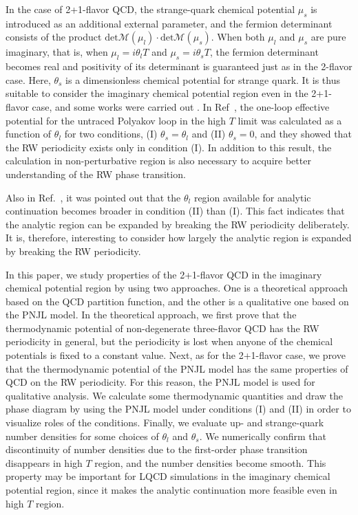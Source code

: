 \documentclass[prd,superscriptaddress,unsortedaddress,
twocolumn,showpacs,preprintnumbers,amsmath,amssymb]{revtex4}
\begin{document}
In the case of 2+1-flavor QCD,
the strange-quark chemical potential $\mu_{s}$
is introduced as an additional external parameter,
and the fermion determinant
consists of the product
$\textrm{det}\mathcal{M}(\mu_{l})\cdot\textrm{det}\mathcal{M}(\mu_{s})$.
When both $\mu_{l}$ and $\mu_{s}$ are pure imaginary,
that is, when $\mu_{l}=i\theta_{l}T$ and $\mu_{s}=i\theta_{s}T$,
the fermion determinant becomes real and
positivity of its determinant is guaranteed just as in the 2-flavor case.
Here, $\theta_{s}$ is a dimensionless chemical potential
for strange quark.
It is thus suitable to consider the imaginary chemical potential region
even in the 2+1-flavor case,
and some works were carried out
\cite{Cea, Bonati, Bonati2, Bonati3,DElia-Gagliardi-Sanfilippo}.
In Ref~\cite{Bonati},
the one-loop effective potential for
the untraced Polyakov loop in the high $T$ limit
was calculated as a function of $\theta_{l}$ for two conditions,
(I) $\theta_{s}=\theta_{l}$ and (II) $\theta_{s}=0$,
and they showed that the RW periodicity exists only in condition (I).
In addition to this result,
the calculation in non-perturbative region
is also necessary to acquire better understanding of
the RW phase transition.

Also in Ref.~\cite{Bonati}, it was pointed out that
the $\theta_{l}$ region
available for analytic continuation becomes broader in condition (II) than (I).
This fact indicates that the analytic region can be expanded
by breaking the RW periodicity deliberately.
It is, therefore, interesting to consider how largely the
analytic region is expanded by breaking the RW periodicity.

In this paper, we study properties of the 2+1-flavor QCD
in the imaginary chemical potential region by using two 
approaches. One is a theoretical approach based
on the QCD partition function,
and the other is a qualitative one based on  the PNJL model.
In the theoretical approach, we first prove
that the thermodynamic potential of 
non-degenerate three-flavor QCD has the RW periodicity in general,
but the periodicity is lost when
anyone of the chemical potentials is fixed to a constant value.
Next, as for the 2+1-flavor case,
we prove that the thermodynamic potential
of the PNJL model has the same properties of QCD
on the RW periodicity.
For this reason,
the PNJL model is used for qualitative analysis.
We calculate some thermodynamic quantities
and draw the phase diagram by 
using the PNJL model
under conditions (I) and (II) in order to visualize 
roles of the conditions.
Finally, we evaluate up- and strange-quark number densities
for some choices of $\theta_{l}$ and $\theta_{s}$.
We numerically confirm that discontinuity of number densities
due to the first-order phase transition disappears in high $T$ region,
and the number densities become smooth. 
This property may be important for LQCD simulations 
in the imaginary chemical potential region, 
since it makes the analytic continuation more feasible
even in high $T$ region.
\end{document}
